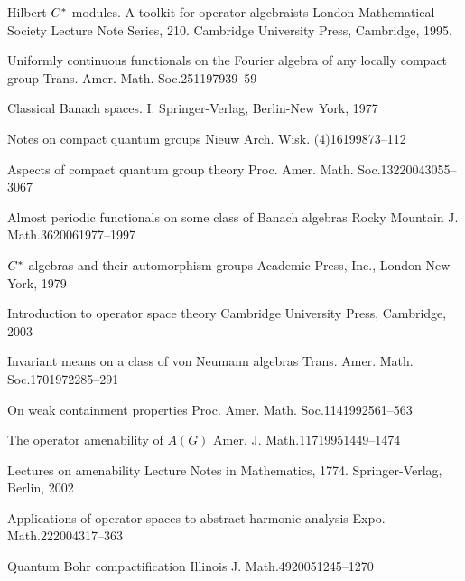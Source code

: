 \documentclass[twoside,a4paper]{article}
\theoremstyle{definition}
\theoremstyle{remark}
\begin{document}
\begin{thebibliography}{99}
 
   {Hilbert $C\sp *$-modules. A toolkit for operator algebraists}
   {London Mathematical Society Lecture Note Series, 210.
   Cambridge University Press, Cambridge, 1995.}

 
   {Uniformly continuous functionals on the Fourier algebra of any locally compact group}
   {Trans. Amer. Math. Soc.}{251}{1979}{39--59}

 
   {Classical Banach spaces. I.}
   {Springer-Verlag, Berlin-New York, 1977}

 
   {Notes on compact quantum groups}
   {Nieuw Arch. Wisk. (4)}{16}{1998}{73--112}

 
   {Aspects of compact quantum group theory}
   {Proc. Amer. Math. Soc.}{132}{2004}{3055--3067}

 
   {Almost periodic functionals on some class of Banach algebras}
   {Rocky Mountain J. Math.}{36}{2006}{1977--1997}

 
   {$C\sp{*} $-algebras and their automorphism groups}
   {Academic Press, Inc., London-New York, 1979}

 
   {Introduction to operator space theory}
   {Cambridge University Press, Cambridge, 2003}

 
   {Invariant means on a class of von {N}eumann algebras}
   {Trans. Amer. Math. Soc.}{170}{1972}{285--291}

 
   {On weak containment properties}
   {Proc. Amer. Math. Soc.}{114}{1992}{561--563}

 
   {The operator amenability of $A(G)$}
   {Amer. J. Math.}{117}{1995}{1449--1474}

 
   {Lectures on amenability}
   {Lecture Notes in Mathematics, 1774. Springer-Verlag, Berlin, 2002}

 
   {Applications of operator spaces to abstract harmonic analysis}
   {Expo. Math.}{22}{2004}{317--363}

 
   {Quantum Bohr compactification}
   {Illinois J. Math.}{49}{2005}{1245--1270}


\end{thebibliography}
\end{document}
